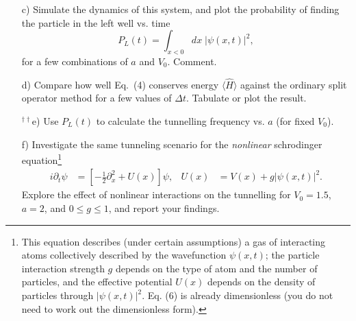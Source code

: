 \documentclass[11pt]{article}
\begin{document}
\begin{enumerate}
\item [c)] Simulate the dynamics of this system, and plot the probability of finding the particle in the left well  vs. time
\begin{equation}
P_L(t) = \int_{x<0} dx\;    |\psi(x,t)|^2,
\end{equation} 
for a few combinations of $a$ and $V_0$. Comment.

\item[ d)]   Compare how well Eq.~(4)  conserves energy $\langle \hat H \rangle$ against the ordinary split operator method for a few values of $\Delta t$. Tabulate or plot the result.

\item [$^{\dagger\dagger}$e)]  Use $P_L(t)$ to calculate the tunnelling frequency vs. $ a$ (for fixed $V_0$).

\item [f)] Investigate the same tunneling scenario for the \emph{nonlinear} schrodinger equation\footnote[1]{This equation describes (under certain assumptions) a gas of interacting atoms collectively described by the wavefunction $\psi(x,t)$; the particle interaction strength $g$ depends on the type of atom and the number of particles, and the effective potential $U(x)$ depends on the density of particles through $|\psi(x,t)|^2$. Eq. (6) is already dimensionless (you do not need to work out the dimensionless form). } 
\begin{align}
i\partial_t \psi &= [-\tfrac{1}{2} \partial_x^2 + U(x)] \psi, &U (x) &=  V(x) + g |\psi(x,t)|^2.
\end{align}
 Explore the effect of nonlinear interactions on the tunnelling for $V_0= 1.5$, $a =2$, and $ 0 \leq g \leq 1$,  and report your findings.

\end{enumerate}
\vspace{1cm}
\end{document}
